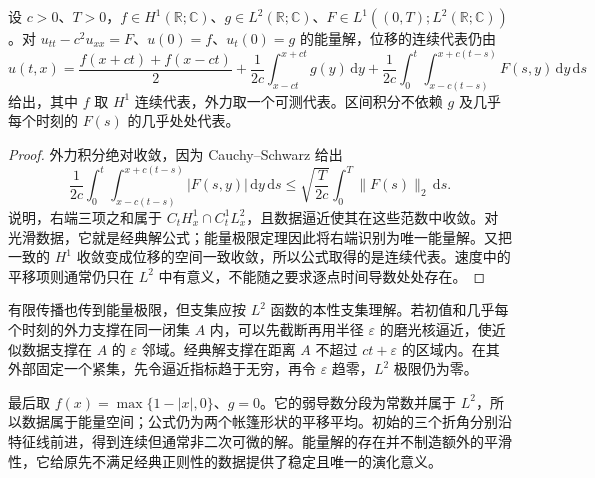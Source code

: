 \begin{corollary}[粗数据的点值公式]\label{b2:cor:09-energy-point-formula}
设 \(c>0\)、\(T>0\)，\(f\in H^1(\mathbb R;\mathbb C)\)、\(g\in L^2(\mathbb R;\mathbb C)\)、\(F\in L^1((0,T);L^2(\mathbb R;\mathbb C))\)。对 \(u_{tt}-c^2u_{xx}=F\)、\(u(0)=f\)、\(u_t(0)=g\) 的能量解，位移的连续代表仍由
\[
 u(t,x)=\dfrac{f(x+ct)+f(x-ct)}2
 +\dfrac1{2c}\int_{x-ct}^{x+ct}g(y)\,\mathrm{d}y
 +\dfrac1{2c}\int_0^t\int_{x-c(t-s)}^{x+c(t-s)}F(s,y)\,\mathrm{d}y\,\mathrm{d}s
\]
给出，其中 \(f\) 取 \(H^1\) 连续代表，外力取一个可测代表。区间积分不依赖 \(g\) 及几乎每个时刻的 \(F(s)\) 的几乎处处代表。
\end{corollary}
\begin{proof}
外力积分绝对收敛，因为 Cauchy--Schwarz 给出
\[
 \dfrac1{2c}\int_0^t\int_{x-c(t-s)}^{x+c(t-s)}|F(s,y)|\,\mathrm{d}y\,\mathrm{d}s
 \leq\sqrt{\dfrac{T}{2c}}\int_0^T\|F(s)\|_2\,\mathrm{d}s.
\]
说明，右端三项之和属于 \(C_tH^1_x\cap C_t^1L^2_x\)，且数据逼近使其在这些范数中收敛。对光滑数据，它就是经典解公式；能量极限定理因此将右端识别为唯一能量解。又把一致的 \(H^1\) 收敛变成位移的空间一致收敛，所以公式取得的是连续代表。速度中的平移项则通常仍只在 \(L^2\) 中有意义，不能随之要求逐点时间导数处处存在。
\end{proof}

有限传播也传到能量极限，但支集应按 \(L^2\) 函数的本性支集理解。若初值和几乎每个时刻的外力支撑在同一闭集 \(A\) 内，可以先截断再用半径 \(\varepsilon\) 的磨光核逼近，使近似数据支撑在 \(A\) 的 \(\varepsilon\) 邻域。经典解支撑在距离 \(A\) 不超过 \(ct+\varepsilon\) 的区域内。在其外部固定一个紧集，先令逼近指标趋于无穷，再令 \(\varepsilon\) 趋零，\(L^2\) 极限仍为零。

\ProseParagraphBreak

最后取 \(f(x)=\max\{1-|x|,0\}\)、\(g=0\)。它的弱导数分段为常数并属于 \(L^2\)，所以数据属于能量空间；公式仍为两个帐篷形状的平移平均。初始的三个折角分别沿特征线前进，得到连续但通常非二次可微的解。能量解的存在并不制造额外的平滑性，它给原先不满足经典正则性的数据提供了稳定且唯一的演化意义。
